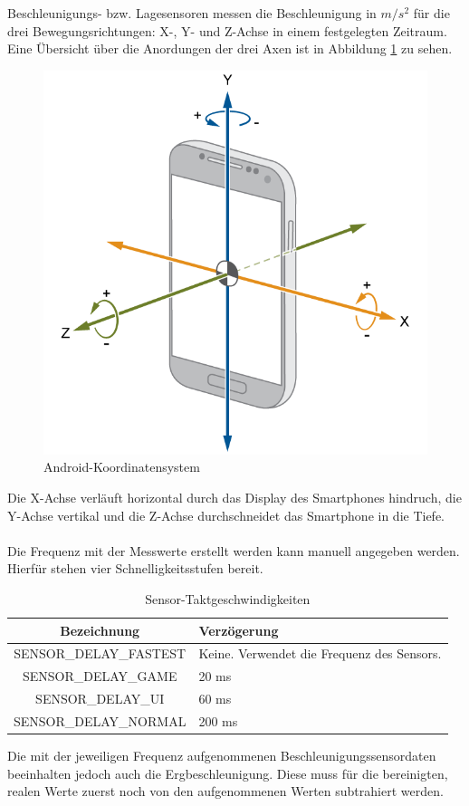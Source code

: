 \documentclass[11pt,a4paper]{report}
\begin{document}
Beschleunigungs- bzw. Lagesensoren messen die Beschleunigung in $m/s^2$ für die drei Bewegungsrichtungen: X-, Y- und Z-Achse in einem festgelegten Zeitraum.
Eine Übersicht über die Anordungen der drei Axen ist in Abbildung \ref{fig:and_axes} zu sehen.
\begin{figure}[htbp]
  \centering
  \includegraphics[width=.7\textwidth]{images/android_axes.png}
  \caption{Android-Koordinatensystem}
  \label{fig:and_axes}
\end{figure}
Die X-Achse verläuft horizontal durch das Display des Smartphones hindruch, die Y-Achse vertikal und die Z-Achse durchschneidet das Smartphone in die Tiefe.
\\\\
Die Frequenz mit der Messwerte erstellt werden kann manuell angegeben werden.
Hierfür stehen vier Schnelligkeitsstufen bereit.
\begin{table}[htbp]
  \centering
  \begin{tabular}{|c|p{4cm}|}
      \hline
      \textbf{Bezeichnung} & \textbf{Verzögerung} \\
	  \hline
      SENSOR\_DELAY\_FASTEST & Keine. Verwendet die Frequenz des Sensors.\\
      \hline
      SENSOR\_DELAY\_GAME & 20 ms\\
      \hline
      SENSOR\_DELAY\_UI & 60 ms\\
      \hline
      SENSOR\_DELAY\_NORMAL & 200 ms\\
      \hline
  \end{tabular}
  \caption{Sensor-Taktgeschwindigkeiten}
  \label{tab:sensor_speeds}
\end{table}
Die mit der jeweiligen Frequenz aufgenommenen Beschleunigungssensordaten beeinhalten jedoch auch die Ergbeschleunigung.
Diese muss für die bereinigten, realen Werte zuerst noch von den aufgenommenen Werten subtrahiert werden\cite{accel_g}.
\end{document}

